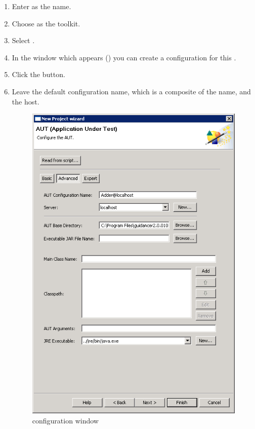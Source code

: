 \begin{enumerate}
\item Enter  as the \gdaut{} name. 
\item Choose  as the toolkit.
\item Select .
\item In the window which appears () you can create a configuration for this \gdaut{}. 
\item Click the  button.
\item Leave the default configuration name, which is a composite of the \gdaut{} name, and the \gdagent{} host. 

\begin{figure}[h]
\begin{center}
\includegraphics[width=12cm]{Tutorials/PS/TutConfigureAUT}
\caption{\gdaut configuration window}
\label{TutConfigureAUT}
\end{center}
\end{figure}


\end{enumerate}
